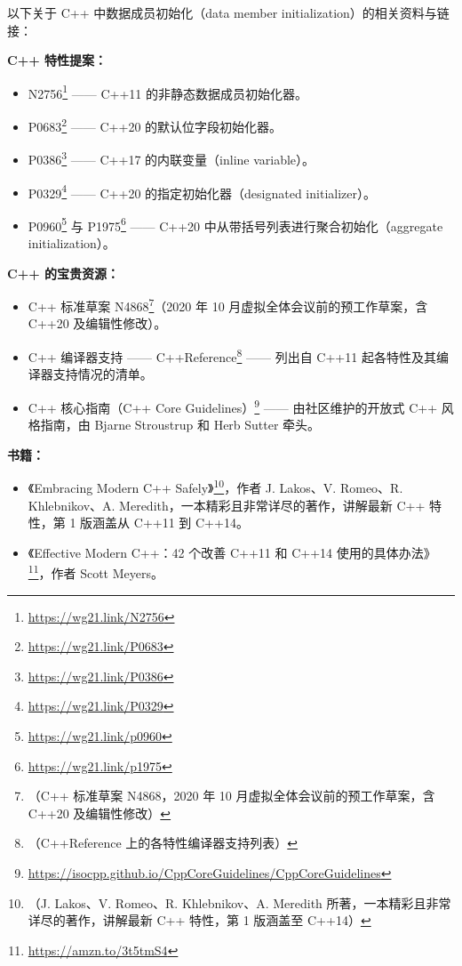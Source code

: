 以下关于 C++ 中数据成员初始化（data member initialization）的相关资料与链接：

\textbf{C++ 特性提案：}

\begin{itemize}
\item N2756\footnote{\url{https://wg21.link/N2756}} —— C++11 的非静态数据成员初始化器。
\item P0683\footnote{\url{https://wg21.link/P0683}} —— C++20 的默认位字段初始化器。
\item P0386\footnote{\url{https://wg21.link/P0386}} —— C++17 的内联变量（inline variable）。
\item P0329\footnote{\url{https://wg21.link/P0329}} —— C++20 的指定初始化器（designated initializer）。
\item P0960\footnote{\url{https://wg21.link/p0960}} 与 P1975\footnote{\url{https://wg21.link/p1975}} —— C++20 中从带括号列表进行聚合初始化（aggregate initialization）。
\end{itemize}

\textbf{C++ 的宝贵资源：}

\begin{itemize}
\item C++ 标准草案 N4868\footnote{（C++ 标准草案 N4868，2020 年 10 月虚拟全体会议前的预工作草案，含 C++20 及编辑性修改）}（2020 年 10 月虚拟全体会议前的预工作草案，含 C++20 及编辑性修改）。
\item C++ 编译器支持 —— C++Reference\footnote{（C++Reference 上的各特性编译器支持列表）} —— 列出自 C++11 起各特性及其编译器支持情况的清单。
\item C++ 核心指南（C++ Core Guidelines）\footnote{\url{https://isocpp.github.io/CppCoreGuidelines/CppCoreGuidelines}} —— 由社区维护的开放式 C++ 风格指南，由 Bjarne Stroustrup 和 Herb Sutter 牵头。
\end{itemize}

\textbf{书籍：}

\begin{itemize}
\item 《Embracing Modern C++ Safely》\footnote{（J. Lakos、V. Romeo、R. Khlebnikov、A. Meredith 所著，一本精彩且非常详尽的著作，讲解最新 C++ 特性，第 1 版涵盖至 C++14）}，作者 J. Lakos、V. Romeo、R. Khlebnikov、A. Meredith，一本精彩且非常详尽的著作，讲解最新 C++ 特性，第 1 版涵盖从 C++11 到 C++14。
\item 《Effective Modern C++：42 个改善 C++11 和 C++14 使用的具体办法》\footnote{\url{https://amzn.to/3t5tmS4}}，作者 Scott Meyers。
\end{itemize}

